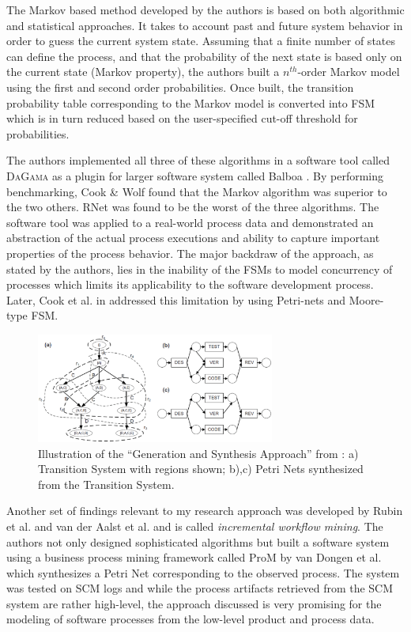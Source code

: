 \documentclass{sig-alternate}
\begin{document}
The Markov based method developed by the authors is based on both algorithmic and statistical approaches. It takes to account past and future system behavior in order to guess the current system state. Assuming that a finite number of states can define the process, and that the probability of the next state is based only on the current state (Markov property), the authors built a $n^{th}$-order Markov model using the first and second order probabilities. Once built, the transition probability table corresponding to the Markov model is converted into FSM which is in turn reduced based on the user-specified cut-off threshold for probabilities.

The authors implemented all three of these algorithms in a software tool called \textsc{DaGama} as a plugin for larger software system called Balboa \cite{citeulike:5120757}. By performing benchmarking, Cook \& Wolf found that the Markov algorithm was superior to the two others. RNet was found to be the worst of the three algorithms. The software tool was applied to a real-world process data and demonstrated an abstraction of the actual process executions and ability to capture important properties of the process behavior. The major backdraw of the approach, as stated by the authors, lies in the inability of the FSMs to model concurrency of processes which limits its applicability to the software development process. Later, Cook et al. in \cite{citeulike:5128143} addressed this limitation by using Petri-nets and Moore-type FSM.

\begin{figure}[tbp]
   \centering
   \includegraphics[height=36mm]{petri.eps}
   \caption{Illustration of the ``Generation and Synthesis Approach'' from \cite{citeulike:5043673}: a) Transition System with regions shown; b),c) Petri Nets synthesized from the Transition System.}
   \label{fig:petri}
\end{figure}

Another set of findings relevant to my research approach was developed by Rubin et al. \cite{citeulike:1885717} and van der Aalst et al. \cite{citeulike:3718014} and is called \textit{incremental workflow mining}. The authors not only designed sophisticated algorithms but built a software system using a business process mining framework called ProM by van Dongen et al. \cite{citeulike:5043673} which synthesizes a Petri Net corresponding to the observed process. The system was tested on SCM logs and while the process artifacts retrieved from the SCM system are rather high-level, the approach discussed is very promising for the modeling of software processes from the low-level product and process data.
\end{document}
